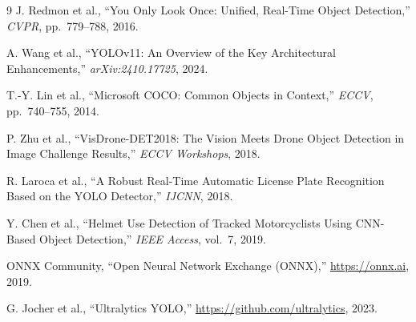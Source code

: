 \documentclass[10pt,twocolumn]{article}
\begin{document}
\begin{thebibliography}{9}
\small
{}
J. Redmon et al., ``You Only Look Once: Unified, Real-Time Object Detection,''
\textit{CVPR}, pp.\ 779--788, 2016.

A. Wang et al., ``YOLOv11: An Overview of the Key Architectural Enhancements,''
\textit{arXiv:2410.17725}, 2024.

T.-Y. Lin et al., ``Microsoft COCO: Common Objects in Context,''
\textit{ECCV}, pp.\ 740--755, 2014.

P. Zhu et al., ``VisDrone-DET2018: The Vision Meets Drone Object Detection
in Image Challenge Results,'' \textit{ECCV Workshops}, 2018.

R. Laroca et al., ``A Robust Real-Time Automatic License Plate Recognition
Based on the YOLO Detector,'' \textit{IJCNN}, 2018.

Y. Chen et al., ``Helmet Use Detection of Tracked Motorcyclists Using
CNN-Based Object Detection,'' \textit{IEEE Access}, vol.\ 7, 2019.

ONNX Community, ``Open Neural Network Exchange (ONNX),''
\url{https://onnx.ai}, 2019.

G. Jocher et al., ``Ultralytics YOLO,'' \url{https://github.com/ultralytics},
2023.
\end{thebibliography}
\end{document}
